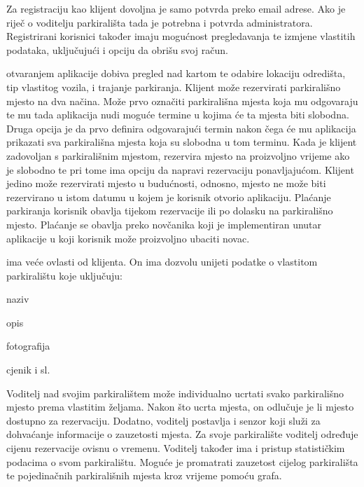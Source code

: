 		Za registraciju kao klijent dovoljna je samo potvrda preko email adrese. Ako je riječ o voditelju parkirališta tada je potrebna i potvrda administratora. Registrirani korisnici također imaju mogućnost pregledavanja te izmjene vlastitih podataka, uključujući i opciju da obrišu svoj račun.
		
		   otvaranjem aplikacije dobiva pregled nad kartom te odabire lokaciju odredišta, tip vlastitog vozila, i trajanje parkiranja. Klijent može rezervirati parkirališno mjesto na dva načina. Može prvo označiti parkirališna mjesta koja mu odgovaraju te mu tada aplikacija nudi moguće termine u kojima će ta mjesta biti slobodna. Druga opcija je da prvo definira odgovarajući termin nakon čega će mu aplikacija prikazati sva parkirališna mjesta koja su slobodna u tom terminu. Kada je klijent zadovoljan s parkirališnim mjestom, rezervira mjesto na proizvoljno vrijeme ako je slobodno te pri tome ima opciju da napravi rezervaciju ponavljajućom. Klijent jedino može rezervirati mjesto u budućnosti, odnosno, mjesto ne može biti rezervirano u istom datumu u kojem je korisnik otvorio aplikaciju. Plaćanje parkiranja korisnik obavlja tijekom rezervacije ili po dolasku na parkirališno mjesto. Plaćanje se obavlja preko novčanika koji je implementiran unutar aplikacije u koji korisnik može proizvoljno ubaciti novac. 
		
		  ima veće ovlasti od klijenta. On ima dozvolu unijeti podatke o vlastitom parkiralištu koje uključuju:
		  
		  
		 
		 \begin{packed_item}
		 	\item naziv
		 	\item opis
		 	\item fotografija
		 	\item cjenik i sl.
		 \end{packed_item}
		
		\noindent Voditelj nad svojim parkiralištem može individualno ucrtati svako parkirališno mjesto prema vlastitim željama. Nakon što ucrta mjesta, on odlučuje je li mjesto dostupno za rezervaciju. Dodatno, voditelj postavlja i senzor koji služi za dohvaćanje informacije o zauzetosti mjesta. Za svoje parkiralište voditelj određuje cijenu rezervacije ovisnu o vremenu. Voditelj također ima i pristup statističkim podacima o svom parkiralištu. Moguće je promatrati zauzetost cijelog parkirališta te pojedinačnih parkirališnih mjesta kroz vrijeme pomoću grafa.
		
